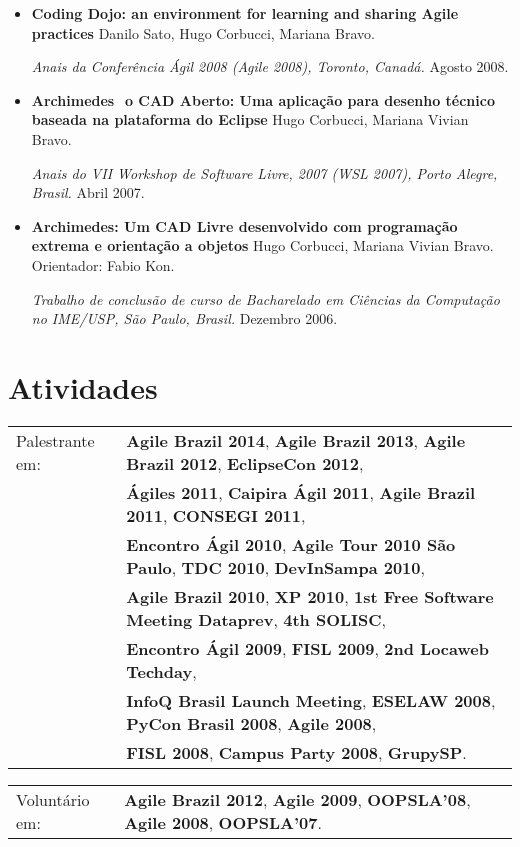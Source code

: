 \documentclass[letter,10pt]{article}
\begin{document}
\begin{itemize}
\item \textbf{Coding Dojo: an environment for learning and sharing
    Agile practices} Danilo Sato, Hugo Corbucci, Mariana Bravo.

  \textit{Anais da Conferência Ágil 2008 (Agile 2008), Toronto,
    Canadá.} Agosto 2008.

\item \textbf{Archimedes ­ o CAD Aberto: Uma aplicação para desenho
    técnico baseada na plataforma do Eclipse} Hugo Corbucci, Mariana
  Vivian Bravo.

  \textit{Anais do VII Workshop de Software Livre, 2007 (WSL 2007),
    Porto Alegre, Brasil.} Abril 2007.

\item \textbf{Archimedes: Um CAD Livre desenvolvido com programação
    extrema e orientação a objetos} Hugo Corbucci, Mariana Vivian
  Bravo. Orientador: Fabio Kon.

  \textit{Trabalho de conclusão de curso de Bacharelado em Ciências da
    Computação no IME/USP, São Paulo, Brasil.} Dezembro 2006.
\end{itemize}

\section{Atividades}

\begin{tabular}{p{2.5cm}l}
  Palestrante em: & \textbf{Agile Brazil 2014}, \textbf{Agile Brazil 2013}, \textbf{Agile Brazil 2012}, \textbf{EclipseCon 2012},\\
  & \textbf{Ágiles 2011}, \textbf{Caipira Ágil 2011}, \textbf{Agile Brazil 2011}, \textbf{CONSEGI 2011},\\
  & \textbf{Encontro Ágil 2010}, \textbf{Agile Tour 2010 São Paulo}, \textbf{TDC 2010}, \textbf{DevInSampa 2010},\\
  & \textbf{Agile Brazil 2010}, \textbf{XP 2010}, \textbf{1st Free Software Meeting Dataprev}, \textbf{4th SOLISC},\\
  & \textbf{Encontro Ágil 2009}, \textbf{FISL 2009}, \textbf{2nd Locaweb Techday},\\
  & \textbf{InfoQ Brasil Launch Meeting}, \textbf{ESELAW 2008}, \textbf{PyCon Brasil 2008}, \textbf{Agile 2008},\\
  & \textbf{FISL 2008}, \textbf{Campus Party 2008}, \textbf{GrupySP}.
\end{tabular}

\begin{tabular}{p{2.5cm}l}
  Voluntário em: & \textbf{Agile Brazil 2012}, \textbf{Agile 2009}, \textbf{OOPSLA'08}, \textbf{Agile 2008}, \textbf{OOPSLA'07}.
\end{tabular}
\end{document}
